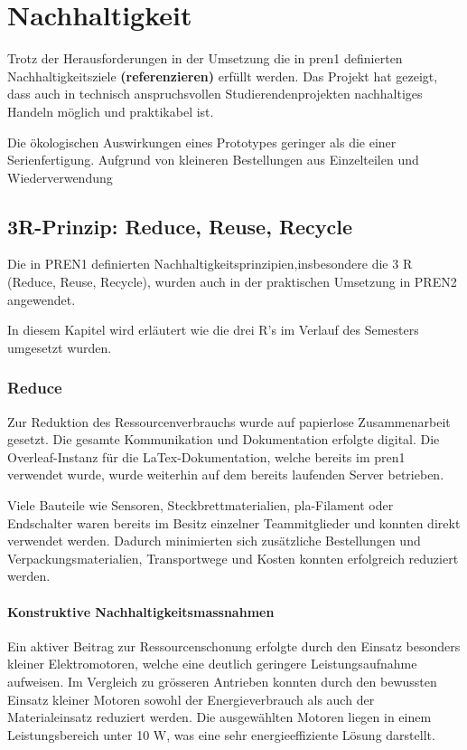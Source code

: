 \section{Nachhaltigkeit}

Trotz der Herausforderungen in der Umsetzung die in \acrshort{pren1}  definierten Nachhaltigkeitsziele \textbf{(referenzieren)} erfüllt werden. Das Projekt hat gezeigt, dass auch in technisch anspruchsvollen Studierendenprojekten nachhaltiges Handeln möglich und praktikabel ist.

Die ökologischen Auswirkungen eines Prototypes geringer als die einer Serienfertigung. Aufgrund von kleineren Bestellungen aus Einzelteilen und Wiederverwendung

\subsection{3R-Prinzip: Reduce, Reuse, Recycle}
Die in PREN1 definierten Nachhaltigkeitsprinzipien,insbesondere die 3 R (Reduce, Reuse, Recycle), wurden auch in der praktischen Umsetzung in PREN2 angewendet.  

 In diesem Kapitel wird erläutert wie die drei R's im Verlauf des Semesters umgesetzt wurden.

\subsubsection{Reduce}


Zur Reduktion des Ressourcenverbrauchs wurde auf papierlose Zusammenarbeit gesetzt. Die gesamte Kommunikation und Dokumentation erfolgte digital. Die Overleaf-Instanz für die LaTex-Dokumentation, welche bereits im \acrshort{pren1} verwendet wurde, wurde weiterhin auf dem bereits laufenden Server betrieben.

Viele Bauteile wie Sensoren, Steckbrettmaterialien, \acrshort{pla}-Filament oder Endschalter waren bereits im Besitz einzelner Teammitglieder und konnten direkt verwendet werden. Dadurch minimierten sich zusätzliche Bestellungen und Verpackungsmaterialien, Transportwege und Kosten konnten erfolgreich reduziert werden.

\paragraph{Konstruktive Nachhaltigkeitsmassnahmen}
Ein aktiver Beitrag zur Ressourcenschonung erfolgte durch den Einsatz besonders kleiner Elektromotoren, welche eine deutlich geringere Leistungsaufnahme aufweisen. Im Vergleich zu grösseren Antrieben konnten durch den bewussten Einsatz kleiner Motoren sowohl der Energieverbrauch als auch der Materialeinsatz reduziert werden. Die ausgewählten Motoren liegen in einem Leistungsbereich unter 10 W, was eine sehr energieeffiziente Lösung darstellt. %

